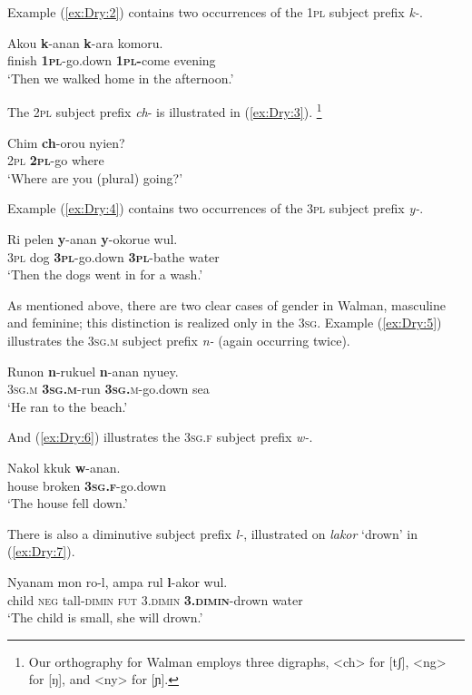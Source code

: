 \documentclass[output=collectionpaper]{langsci/langscibook}
\begin{document}
Example (\ref{ex:Dry:2}) contains two occurrences of the \textsc{1pl} subject prefix \textit{k-}.

\ea \label{ex:Dry:2}
\gll Akou \textbf{k}-anan \textbf{k}-ara komoru.\\
finish \textbf{\textsc{1pl}}-go.down \textbf{\textsc{1pl-}}come evening\\
\glt `Then we walked home in the afternoon.'
\z

The \textsc{2pl} subject prefix \textit{ch}- is illustrated in (\ref{ex:Dry:3}).%
\footnote{Our orthography for Walman employs three digraphs, <ch> for [tʃ], <ng> for [ŋ], and <ny> for [ɲ].}

\ea \label{ex:Dry:3}
\gll
Chim	 \textbf{ch}-orou nyien?\\
\textsc{2pl} \textbf{\textsc{2pl}}-go where\\
\glt `Where are you (plural) going?'
\z

Example (\ref{ex:Dry:4}) contains two occurrences of the \textsc{3pl} subject prefix \textit{y-}.

\ea \label{ex:Dry:4}
\gll Ri	pelen	\textbf{y}-anan	\textbf{y}-okorue	wul.\\
\textsc{3pl} dog \textbf{\textsc{3pl}}-go.down \textbf{\textsc{3pl}}-bathe water\\
\glt `Then the dogs went in for a wash.'
\z

As mentioned above, there are two clear cases of gender in Walman, masculine and feminine; this distinction is realized only in the \textsc{3sg}. Example (\ref{ex:Dry:5}) illustrates the \textsc{3sg.m} subject prefix \textit{n-} (again occurring twice).

\ea \label{ex:Dry:5}
\gll Runon	\textbf{n}-rukuel 	\textbf{n}-anan	nyuey.\\
\textsc{3sg.m} \textbf{\textsc{3sg.m}}-run \textbf{\textsc{3sg.}}\textsc{m}-go.down sea\\
\glt `He ran to the beach.'
\z

And (\ref{ex:Dry:6}) illustrates the \textsc{3sg.f} subject prefix \textit{w-}.

\ea \label{ex:Dry:6}
\gll Nakol	kkuk	\textbf{w}-anan.\\
house broken \textbf{\textsc{3sg.f}}-go.down\\
\glt `The house fell down.'
\z

There is also a diminutive subject prefix \textit{l-}, illustrated on \textit{lakor} `drown' in (\ref{ex:Dry:7}).

\ea \label{ex:Dry:7}
\gll Nyanam	mon	ro-l,	ampa	rul \textbf{l}-akor	wul.\\
child \textsc{neg} tall-\textsc{dimin} \textsc{fut} \textsc{3.dimin} \textbf{\textsc{3.dimin}}-drown water\\
\glt `The child is small, she will drown.'
\z
\end{document}
